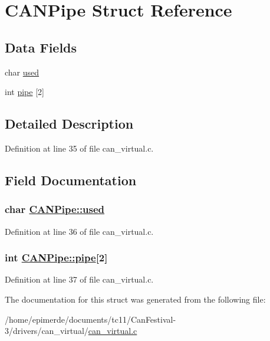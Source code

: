 \hypertarget{structCANPipe}{
\section{CANPipe Struct Reference}
\label{structCANPipe}
}
\subsection*{Data Fields}
\begin{CompactItemize}
\item 
char \hyperlink{structCANPipe_86b7d0cf232b1b6b687c19b61434aa2f}{used}
\item 
int \hyperlink{structCANPipe_e9844050beddb410380d91715c53debc}{pipe} \mbox{[}2\mbox{]}
\end{CompactItemize}


\subsection{Detailed Description}




Definition at line 35 of file can\_\-virtual.c.

\subsection{Field Documentation}
\hypertarget{structCANPipe_86b7d0cf232b1b6b687c19b61434aa2f}{
\subsubsection[used]{\setlength{\rightskip}{0pt plus 5cm}char \hyperlink{structCANPipe_86b7d0cf232b1b6b687c19b61434aa2f}{CANPipe::used}}}
\label{structCANPipe_86b7d0cf232b1b6b687c19b61434aa2f}




Definition at line 36 of file can\_\-virtual.c.\hypertarget{structCANPipe_e9844050beddb410380d91715c53debc}{
\subsubsection[pipe]{\setlength{\rightskip}{0pt plus 5cm}int \hyperlink{structCANPipe_e9844050beddb410380d91715c53debc}{CANPipe::pipe}\mbox{[}2\mbox{]}}}
\label{structCANPipe_e9844050beddb410380d91715c53debc}




Definition at line 37 of file can\_\-virtual.c.

The documentation for this struct was generated from the following file:\begin{CompactItemize}
\item 
/home/epimerde/documents/tc11/Can\-Festival-3/drivers/can\_\-virtual/\hyperlink{can__virtual_8c}{can\_\-virtual.c}\end{CompactItemize}
